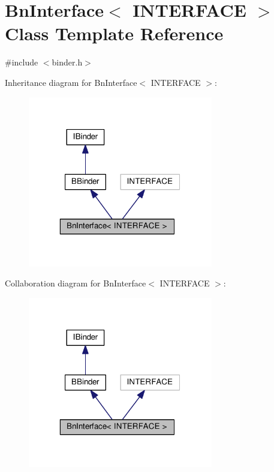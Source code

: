 \hypertarget{classBnInterface}{\section{Bn\-Interface$<$ I\-N\-T\-E\-R\-F\-A\-C\-E $>$ Class Template Reference}
\label{classBnInterface}
}


{\ttfamily \#include $<$binder.\-h$>$}



Inheritance diagram for Bn\-Interface$<$ I\-N\-T\-E\-R\-F\-A\-C\-E $>$\-:
\nopagebreak
\begin{figure}[H]
\begin{center}
\leavevmode
\includegraphics[width=229pt]{classBnInterface__inherit__graph}
\end{center}
\end{figure}


Collaboration diagram for Bn\-Interface$<$ I\-N\-T\-E\-R\-F\-A\-C\-E $>$\-:
\nopagebreak
\begin{figure}[H]
\begin{center}
\leavevmode
\includegraphics[width=229pt]{classBnInterface__coll__graph}
\end{center}
\end{figure}
